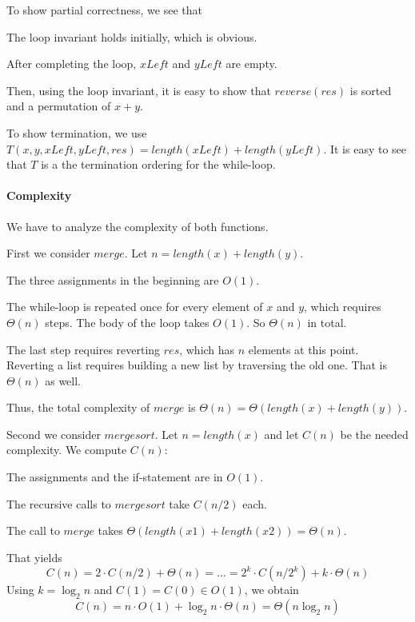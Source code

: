 To show partial correctness, we see that
\begin{compactitem}
  \item The loop invariant holds initially, which is obvious.
  \item After completing the loop, $xLeft$ and $yLeft$ are empty.
  \item Then, using the loop invariant, it is easy to show that $reverse(res)$ is sorted and a permutation of $x+y$.
\end{compactitem}

To show termination, we use $T(x,y,xLeft,yLeft,res)=length(xLeft)+length(yLeft)$.
It is easy to see that $T$ is a the termination ordering for the while-loop.

\paragraph{Complexity}
We have to analyze the complexity of both functions.

First we consider $merge$.
Let $n=length(x)+length(y)$.
\begin{compactitem}
 \item The three assignments in the beginning are $O(1)$.
 \item The while-loop is repeated once for every element of $x$ and $y$, which requires $\Theta(n)$ steps.
 The body of the loop takes $O(1)$. So $\Theta(n)$ in total.
 \item The last step requires reverting $res$, which has $n$ elements at this point.
 Reverting a list requires building a new list by traversing the old one. That is $\Theta(n)$ as well.
\end{compactitem}
Thus, the total complexity of $merge$ is $\Theta(n)=\Theta(length(x)+length(y))$.
\medskip

Second we consider $mergesort$.
Let $n=length(x)$ and let $C(n)$ be the needed complexity.
We compute $C(n)$:
\begin{compactitem}
 \item The assignments and the if-statement are in $O(1)$.
 \item The recursive calls to $mergesort$ take $C(n/2)$ each.
 \item The call to $merge$ takes $\Theta(length(x1)+length(x2))=\Theta(n)$.
\end{compactitem}
That yields
 \[C(n)=2\cdot C(n/2)+\Theta(n) = \ldots = 2^k\cdot C(n/2^k) + k\cdot \Theta(n)\]
 Using $k=\log_2 n$ and $C(1)=C(0)\in O(1)$, we obtain
 \[C(n)=n\cdot O(1)+\log_2 n\cdot \Theta(n)=\Theta(n\log_2 n)\]
\medskip

